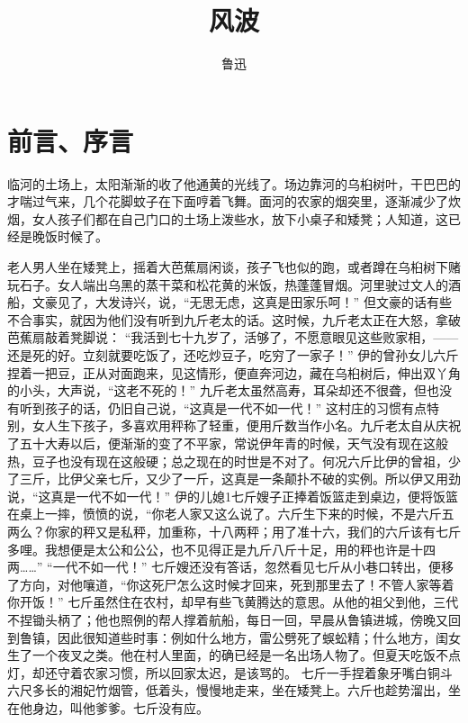 \documentclass[12pt,UTF8]{ctexbook}
\title{\heiti\zihao{0} 风波}
\author{鲁迅}
\date{}
\begin{document}
\maketitle
\tableofcontents

\frontmatter
\chapter{前言、序言}

\mainmatter

临河的土场上，太阳渐渐的收了他通黄的光线了。场边靠河的乌桕树叶，干巴巴的才喘过气来，几个花脚蚊子在下面哼着飞舞。面河的农家的烟突里，逐渐减少了炊烟，女人孩子们都在自己门口的土场上泼些水，放下小桌子和矮凳；人知道，这已经是晚饭时候了。

老人男人坐在矮凳上，摇着大芭蕉扇闲谈，孩子飞也似的跑，或者蹲在乌桕树下赌玩石子。女人端出乌黑的蒸干菜和松花黄的米饭，热蓬蓬冒烟。河里驶过文人的酒船，文豪见了，大发诗兴，说，“无思无虑，这真是田家乐呵！”
但文豪的话有些不合事实，就因为他们没有听到九斤老太的话。这时候，九斤老太正在大怒，拿破芭蕉扇敲着凳脚说：
“我活到七十九岁了，活够了，不愿意眼见这些败家相，——还是死的好。立刻就要吃饭了，还吃炒豆子，吃穷了一家子！”
伊的曾孙女儿六斤捏着一把豆，正从对面跑来，见这情形，便直奔河边，藏在乌桕树后，伸出双丫角的小头，大声说，“这老不死的！”
九斤老太虽然高寿，耳朵却还不很聋，但也没有听到孩子的话，仍旧自己说，“这真是一代不如一代！”
这村庄的习惯有点特别，女人生下孩子，多喜欢用秤称了轻重，便用斤数当作小名。九斤老太自从庆祝了五十大寿以后，便渐渐的变了不平家，常说伊年青的时候，天气没有现在这般热，豆子也没有现在这般硬；总之现在的时世是不对了。何况六斤比伊的曾祖，少了三斤，比伊父亲七斤，又少了一斤，这真是一条颠扑不破的实例。所以伊又用劲说，“这真是一代不如一代！”
伊的儿媳1七斤嫂子正捧着饭篮走到桌边，便将饭篮在桌上一摔，愤愤的说，“你老人家又这么说了。六斤生下来的时候，不是六斤五两么？你家的秤又是私秤，加重称，十八两秤；用了准十六，我们的六斤该有七斤多哩。我想便是太公和公公，也不见得正是九斤八斤十足，用的秤也许是十四两……”
“一代不如一代！”
七斤嫂还没有答话，忽然看见七斤从小巷口转出，便移了方向，对他嚷道，“你这死尸怎么这时候才回来，死到那里去了！不管人家等着你开饭！”
七斤虽然住在农村，却早有些飞黄腾达的意思。从他的祖父到他，三代不捏锄头柄了；他也照例的帮人撑着航船，每日一回，早晨从鲁镇进城，傍晚又回到鲁镇，因此很知道些时事：例如什么地方，雷公劈死了蜈蚣精；什么地方，闺女生了一个夜叉之类。他在村人里面，的确已经是一名出场人物了。但夏天吃饭不点灯，却还守着农家习惯，所以回家太迟，是该骂的。
七斤一手捏着象牙嘴白铜斗六尺多长的湘妃竹烟管，低着头，慢慢地走来，坐在矮凳上。六斤也趁势溜出，坐在他身边，叫他爹爹。七斤没有应。
\end{document}
